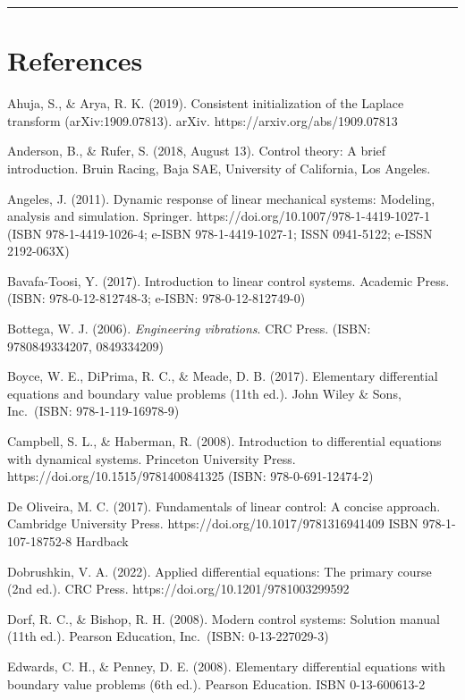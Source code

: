 \documentclass[
  11pt,
]{article}
\begin{document}
\begin{center}\rule{0.5\linewidth}{0.5pt}\end{center}

\hypertarget{references}{%
\section{References}\label{references}}

Ahuja, S., \& Arya, R. K. (2019). Consistent initialization of the
Laplace transform (arXiv:1909.07813). arXiv.
https://arxiv.org/abs/1909.07813

Anderson, B., \& Rufer, S. (2018, August 13). Control theory: A brief
introduction. Bruin Racing, Baja SAE, University of California, Los
Angeles.

Angeles, J. (2011). Dynamic response of linear mechanical systems:
Modeling, analysis and simulation. Springer.
https://doi.org/10.1007/978-1-4419-1027-1 (ISBN 978-1-4419-1026-4;
e-ISBN 978-1-4419-1027-1; ISSN 0941-5122; e-ISSN 2192-063X)

Bavafa-Toosi, Y. (2017). Introduction to linear control systems.
Academic Press. (ISBN: 978-0-12-812748-3; e-ISBN: 978-0-12-812749-0)

Bottega, W. J. (2006). \emph{Engineering vibrations}. CRC Press. (ISBN:
9780849334207, 0849334209)

Boyce, W. E., DiPrima, R. C., \& Meade, D. B. (2017). Elementary
differential equations and boundary value problems (11th ed.). John
Wiley \& Sons, Inc.~(ISBN: 978-1-119-16978-9)

Campbell, S. L., \& Haberman, R. (2008). Introduction to differential
equations with dynamical systems. Princeton University Press.
https://doi.org/10.1515/9781400841325 (ISBN: 978-0-691-12474-2)

De Oliveira, M. C. (2017). Fundamentals of linear control: A concise
approach. Cambridge University Press.
https://doi.org/10.1017/9781316941409 ISBN 978-1-107-18752-8 Hardback

Dobrushkin, V. A. (2022). Applied differential equations: The primary
course (2nd ed.). CRC Press. https://doi.org/10.1201/9781003299592

Dorf, R. C., \& Bishop, R. H. (2008). Modern control systems: Solution
manual (11th ed.). Pearson Education, Inc.~(ISBN: 0-13-227029-3)

Edwards, C. H., \& Penney, D. E. (2008). Elementary differential
equations with boundary value problems (6th ed.). Pearson Education.
ISBN 0-13-600613-2
\end{document}
